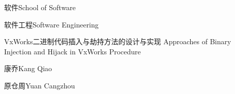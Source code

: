 
\school
{软件}{School of Software}

\major
{软件工程}{Software Engineering}

\thesistitle
{VxWorks二进制代码插入与劫持方法的设计与实现}
{}
{Approaches of Binary Injection and Hijack 
in VxWorks Procedure}
{}

\thesisauthor
{康乔}{Kang Qiao}

\teacher
{ 原仓周}{Yuan Cangzhou}






